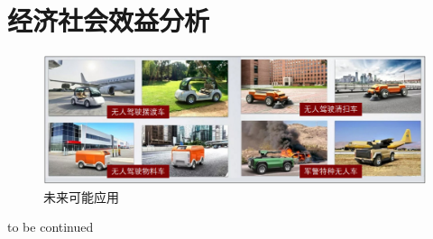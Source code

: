 \newpage
\section{经济社会效益分析}

\begin{figure}[htbp]
	\centering
	\includegraphics[width = 1\textwidth]{fig/wlknyy.png}
	\caption{未来可能应用}
	\label{wlknyy}
\end{figure}

to be continued
